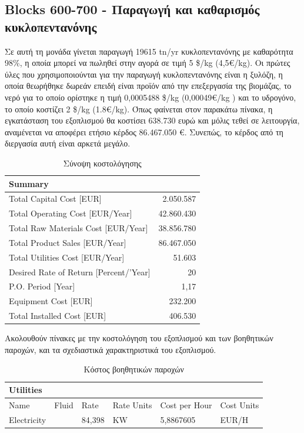 \documentclass[11pt]{article}
\begin{document}
\subsection{Blocks 600-700 - Παραγωγή και καθαρισμός κυκλοπεντανόνης}
\label{sec:org315f920}
Σε αυτή τη μονάδα γίνεται παραγωγή 19615 tn/yr κυκλοπεντανόνης με
καθαρότητα 98\%, η οποία μπορεί να πωληθεί στην αγορά σε τιμή 5 \$/kg
(4,5€/kg). Οι πρώτες ύλες που χρησιμοποιούνται για την παραγωγή
κυκλοπεντανόνης είναι η ξυλόζη, η οποία θεωρήθηκε δωρεάν επειδή είναι
προϊόν από την επεξεργασία της βιομάζας, το νερό για το οποίο ορίστηκε η
τιμή 0,0005488 \$/kg (0,00049€/kg ) και το υδρογόνο, το οποίο κοστίζει 2
\$/kg (1.8€/kg). Όπως φαίνεται στον παρακάτω πίνακα, η εγκατάσταση του
εξοπλισμού θα κοστίσει 638.730 ευρώ και μόλις τεθεί σε λειτουργία,
αναμένεται να αποφέρει ετήσιο κέρδος 86.467.050 €. Συνεπώς, το κέρδος
από τη διεργασία αυτή είναι αρκετά μεγάλο.

\begin{table}[htbp]
\caption{Σύνοψη κοστολόγησης}
\centering
\begin{tabular}{lr}
Summary & \\
\hline
Total Capital Cost [EUR] & 2.050.587\\
Total Operating Cost [EUR/Year] & 42.860.430\\
Total Raw Materials Cost [EUR/Year] & 38.856.780\\
Total Product Sales [EUR/Year] & 86.467.050\\
Total Utilities Cost [EUR/Year] & 51.603\\
Desired Rate of Return [Percent/'Year] & 20\\
P.O. Period [Year] & 1,17\\
Equipment Cost [EUR] & 232.200\\
Total Installed Cost [EUR] & 406.530\\
\end{tabular}
\end{table}

Ακολουθούν πίνακες με την κοστολόγηση του εξοπλισμού και των βοηθητικών
παροχών, και τα σχεδιαστικά χαρακτηριστικά του εξοπλισμού.

\begin{table}[htbp]
\caption{Κόστος βοηθητικών παροχών}
\centering
\begin{tabular}{llllll}
Utilities &  &  &  &  & \\
\hline
Name & Fluid & Rate & Rate Units & Cost per Hour & Cost Units\\
Electricity &   & 84,398 & KW & 5,8867605 & EUR/H\\
\end{tabular}
\end{table}
\end{document}
